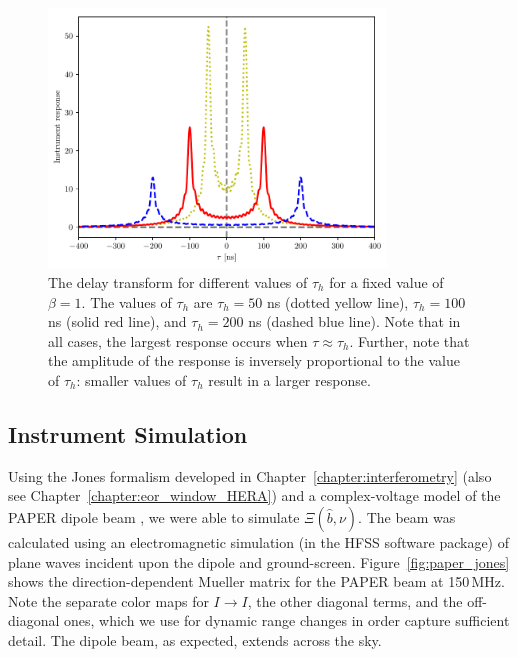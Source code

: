 \begin{figure}
\centering
\includegraphics[width=0.8\textwidth]{chapters/global_signal/figures/vg_th.pdf}
\caption[The delay transform for different values of $\tau_h$.]{
    The delay transform for different values of $\tau_h$ for a fixed
    value of $\beta = 1$. The values of $\tau_h$ are $\tau_h = 50$ ns (dotted
    yellow line), $\tau_h = 100$ ns (solid red line), and $\tau_h = 200$ ns
    (dashed blue line). Note that in all cases, the largest response occurs when
    $\tau \approx \tau_h$. Further, note that the amplitude of the response is
    inversely proportional to the value of $\tau_h$: smaller values of $\tau_h$
    result in a larger response.}
\label{fig:vg_tau_three}
\end{figure}

\subsection{Instrument Simulation}
Using the Jones formalism developed in Chapter~\ref{chapter:interferometry} (also see Chapter~\ref{chapter:eor_window_HERA}) and a complex-voltage model of the PAPER dipole beam \citep{Parsons.10, Pober.12}, we were able to simulate $\Xi(\hat{b},\nu)$. The beam was calculated using an electromagnetic simulation (in the HFSS software package) of plane waves incident upon the dipole and ground-screen. Figure~\ref{fig:paper_jones} shows the direction-dependent Mueller matrix for the PAPER beam at 150\,MHz. Note the separate color maps for $I\rightarrow I$, the other diagonal terms, and the off-diagonal ones, which we use for dynamic range changes in order capture sufficient detail. The dipole beam, as expected, extends across the sky.

